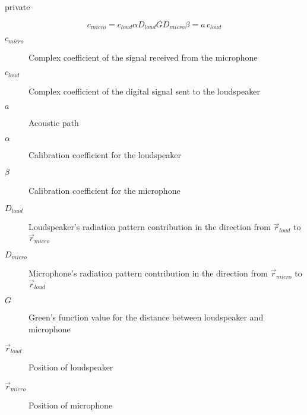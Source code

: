 \begin{shownto}{private}
%

\begin{equation}
c_\mathit{micro} = c_\mathit{loud} \alpha D_{loud} G D_{micro} \beta = a \, c_\mathit{loud}
\label{transEquationCalibration}
\end{equation}

\begin{description}
	\item[$c_\mathit{micro}$] Complex coefficient of the signal received from the microphone
	\item[$c_\mathit{loud}$] Complex coefficient of the digital signal sent to the loudspeaker
	\item[$a$] Acoustic path
	\item[$\alpha$] Calibration coefficient for the loudspeaker
	\item[$\beta$] Calibration coefficient for the microphone
	\item[$D_{loud}$] Loudspeaker's radiation pattern contribution in the direction from $\vec{r}_{loud}$ to $\vec{r}_{micro}$
	\item[$D_{micro}$] Microphone's radiation pattern contribution in the direction from $\vec{r}_{micro}$ to $\vec{r}_{loud}$ 
	\item[$G$] Green's function value for the distance between loudspeaker and microphone
	\item[$\vec{r}_{loud}$] Position of loudspeaker
	\item[$\vec{r}_{micro}$] Position of microphone
\end{description}


\end{shownto}

